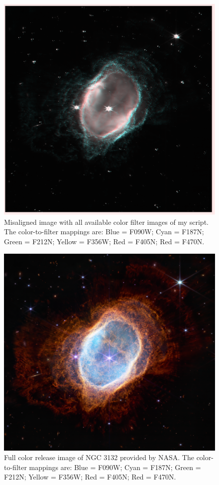\documentclass[10pt,twocolumn,letterpaper]{article}
\begin{document}
\begin{figure}[t]
  \centering
  \includegraphics[scale=0.11]{misaligned2}
  \caption{Misaligned image with all available color filter images of my script. The color-to-filter mappings are:  Blue = F090W; Cyan = F187N; Green = F212N; Yellow = F356W; Red = F405N; Red = F470N.}
  \label{fig:misaligned}
\end{figure}

\begin{figure}[t]
  \centering
  \includegraphics[scale=0.825]{wiki}
  \caption{Full color release image of NGC 3132 provided by NASA. The color-to-filter mappings are: Blue = F090W; Cyan = F187N; Green = F212N; Yellow = F356W; Red = F405N; Red = F470N.\cite{3132}}
  \label{fig:original}
\end{figure}
\end{document}
